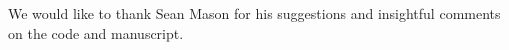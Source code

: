 We would like to thank Sean Mason for his suggestions and insightful comments on the code and manuscript.
